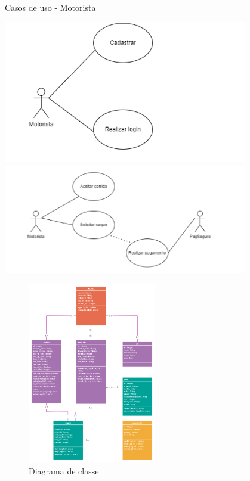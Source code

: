 \newpage
    \caption{Casos de uso - Motorista}
	\includegraphics[width=0.8\textwidth]{exemplos/diagramas/Casos de uso_Motorista 1.PNG}
	\includegraphics[width=0.8\textwidth]{exemplos/diagramas/Casos de uso_Motorista 2.PNG}

\newpage
\begin{figure}
    \caption{Diagrama de classe}
    \includegraphics[width=0.5\textwidth]{exemplos/diagramas/tcc-diagram-class.png}
\end{figure}
